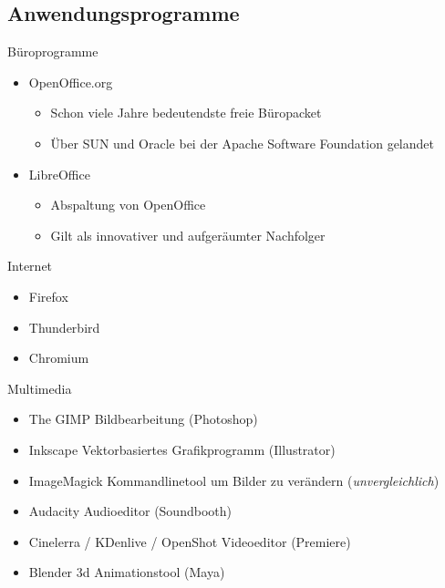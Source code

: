 \documentclass[aspectratio=43]{beamer}
\begin{document}
\subsection{Anwendungsprogramme}
\begin{frame} 

	\begin{block}{Büroprogramme} 
	\begin{itemize}
	\item OpenOffice.org 
	\begin{itemize}
	 \item Schon viele Jahre bedeutendste freie Büropacket
	 \item Über SUN und Oracle bei der Apache Software Foundation gelandet
	\end{itemize}
	\item LibreOffice
	\begin{itemize}
	 \item Abspaltung von OpenOffice
	 \item Gilt als innovativer und aufgeräumter Nachfolger
	\end{itemize}


	\end{itemize}
	\end{block}

	\begin{block}{Internet} 
	\begin{itemize}
	\item Firefox
	\item Thunderbird
	\item Chromium
	\end{itemize}
	\end{block}

	
\end{frame}

\begin{frame} 

	\begin{block}{Multimedia} 
	\begin{itemize}
	\item The GIMP
	\newline Bildbearbeitung (Photoshop)
	\item Inkscape
	\newline Vektorbasiertes Grafikprogramm (Illustrator)
	\item ImageMagick
	\newline Kommandlinetool um Bilder zu verändern (\textit{unvergleichlich})
	\item Audacity
	\newline Audioeditor (Soundbooth)
	\item Cinelerra / KDenlive / OpenShot
	\newline Videoeditor (Premiere)
	\item Blender
	\newline 3d Animationstool (Maya) 
	\end{itemize}

	\end{block}
	
\end{frame}
\end{document}
